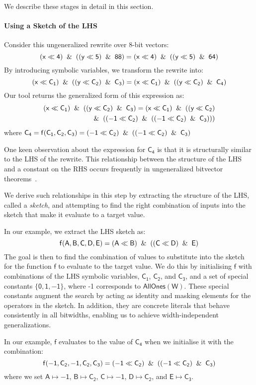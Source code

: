 \documentclass[review, anonymous, acmsmall]{acmart}
\newcommand{\blockmath}[1]{\[\mathsf{#1}\]}
\newcommand{\inline}[1]{$\mathsf{#1}$}
\begin{document}
We describe these stages in detail in this section. 
\paragraph{Using a Sketch of the LHS}
Consider this ungeneralized rewrite over 8-bit vectors:
\blockmath{(x \ll 4) \And ((y \ll 5) \And 88) = (x \ll 4) \And ((y \ll 5) \And 64)}
By introducing symbolic variables, we transform the rewrite into:
\blockmath{(x \ll C_1) \And ((y \ll C_2) \And C_3) = (x \ll C_1) \And ((y \ll C_2) \And C_4)}
Our tool returns the generalized form of this expression as:
\begin{align*}
\mathsf{
(x \ll C_1) \And ((y \ll C_2) \And C_3) = (x \ll C_1)  \And ((y \ll C_2)} \\ 
\mathsf{\And ((-1 \ll C_2) \And ((-1 \ll C_2) \And C_3)))}
\end{align*}
where \inline{C_4 = f(C_1, C_2, C_3) = (-1 \ll C_2) \And ((-1 \ll C_2) \And C_3)}

One keen observation about the expression for \inline{C_4} is that it is structurally similar to the LHS of the rewrite. This relationship between the structure of the LHS and a constant on the RHS occurs frequently in ungeneralized bitvector theorems~\cite{mukherjee_hydra_2024}.  


We derive such relationships in this step by extracting the structure of the LHS, called a \textit{sketch}, and attempting to find the right combination of inputs into the sketch that make it evaluate to a target value. 

In our example, we extract the LHS sketch as:
\blockmath{f(A,B,C,D,E) = (A \ll B) \And ((C \ll D) \And E)}
The goal is then to find the combination of values to substitute into the sketch for the function \inline{f} to evaluate to the target value. We do this by initialising \inline{f} with combinations of the LHS symbolic variables, \inline{C_1}, \inline{C_2}, and \inline{C_3}, and a set of special constants \inline{\{0, 1, {-1}\}}, where -1 corresponds to \inline{AllOnes(W)}. These special constants augment the search by acting as identity and masking elements for the operators in the sketch. In addition, they are concrete literals that behave consistently in all bitwidths, enabling us to achieve width-independent generalizations.  

In our example, \inline{f} evaluates to the value of \inline{C_4} when we initialise it with the combination:
\blockmath{f({-1}, C_2, {-1}, C_2, C_3) = ({-1} \ll C_2) \And (({-1} \ll C_2) \And C_3)}
where we set \inline{A \mapsto {-1}}, \inline{B \mapsto C_2}, \inline{C \mapsto {-1}}, \inline{D \mapsto C_2}, and \inline{E \mapsto C_3}.
\end{document}
